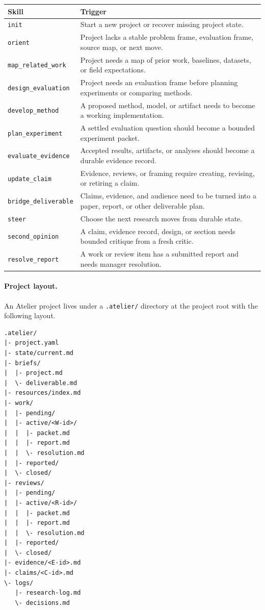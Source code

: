 \begin{center}
  \scriptsize
  \setlength{\tabcolsep}{4pt}
  \begin{tabular}{@{}p{}p{}@{}}
    \toprule
    Skill & Trigger \\
    \midrule
    \texttt{init} & Start a new project or recover missing project state. \\
    \texttt{orient} & Project lacks a stable problem frame, evaluation frame, source map, or next move. \\
    \texttt{map\_related\_work} & Project needs a map of prior work, baselines, datasets, or field expectations. \\
    \texttt{design\_evaluation} & Project needs an evaluation frame before planning experiments or comparing methods. \\
    \texttt{develop\_method} & A proposed method, model, or artifact needs to become a working implementation. \\
    \texttt{plan\_experiment} & A settled evaluation question should become a bounded experiment packet. \\
    \texttt{evaluate\_evidence} & Accepted results, artifacts, or analyses should become a durable evidence record. \\
    \texttt{update\_claim} & Evidence, reviews, or framing require creating, revising, or retiring a claim. \\
    \texttt{bridge\_deliverable} & Claims, evidence, and audience need to be turned into a paper, report, or other deliverable plan. \\
    \texttt{steer} & Choose the next research moves from durable state. \\
    \texttt{second\_opinion} & A claim, evidence record, design, or section needs bounded critique from a fresh critic. \\
    \texttt{resolve\_report} & A work or review item has a submitted report and needs manager resolution. \\
    \bottomrule
  \end{tabular}
\end{center}

\paragraph{Project layout.}
An Atelier project lives under a \texttt{.atelier/} directory at the project root with the following layout.

\begin{small}
\begin{verbatim}
.atelier/
|- project.yaml
|- state/current.md
|- briefs/
|  |- project.md
|  \- deliverable.md
|- resources/index.md
|- work/
|  |- pending/
|  |- active/<W-id>/
|  |  |- packet.md
|  |  |- report.md
|  |  \- resolution.md
|  |- reported/
|  \- closed/
|- reviews/
|  |- pending/
|  |- active/<R-id>/
|  |  |- packet.md
|  |  |- report.md
|  |  \- resolution.md
|  |- reported/
|  \- closed/
|- evidence/<E-id>.md
|- claims/<C-id>.md
\- logs/
   |- research-log.md
   \- decisions.md
\end{verbatim}
\end{small}

